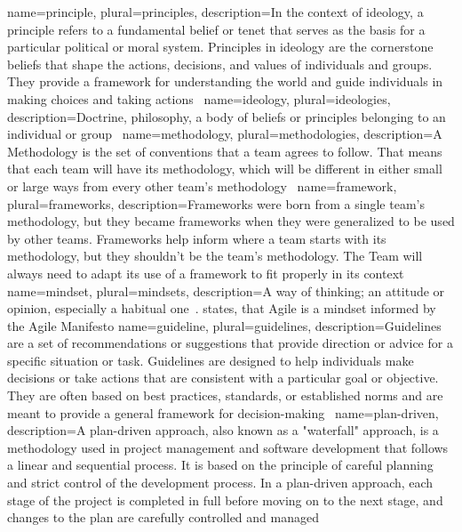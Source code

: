 {
    name={principle},
    plural={principles},
    description={In the context of ideology, a principle refers to a fundamental belief or tenet that serves as the basis for a particular political or moral system. Principles in ideology are the cornerstone beliefs that shape the actions, decisions, and values of individuals and groups. They provide a framework for understanding the world and guide individuals in making choices and taking actions~\cite{Cooper2018MVP}}
}
{
    name={ideology},
    plural={ideologies},
    description={Doctrine, philosophy, a body of beliefs or principles belonging to an individual or group~\cite{2018IvM}}
}
{
    name={methodology},
    plural={methodologies},
    description={A Methodology is the set of conventions that a team agrees to follow. That means that each team will have its methodology, which will be different in either small or large ways from every other team's methodology~\cite{2022WiA}}
}
{
    name={framework},
    plural={frameworks},
    description={Frameworks were born from a single team's methodology, but they became frameworks when they were generalized to be used by other teams. Frameworks help inform where a team starts with its methodology, but they shouldn't be the team's methodology. The Team will always need to adapt its use of a framework to fit properly in its context~\cite{2022WiA}}
}
{
    name={mindset},
    plural={mindsets},
    description={A way of thinking; an attitude or opinion, especially a habitual one~\cite{2018IvM}.  states, that Agile is a mindset informed by the Agile Manifesto}
}
{
    name={guideline},
    plural={guidelines},
    description={Guidelines are a set of recommendations or suggestions that provide direction or advice for a specific situation or task. Guidelines are designed to help individuals make decisions or take actions that are consistent with a particular goal or objective. They are often based on best practices, standards, or established norms and are meant to provide a general framework for decision-making~\cite{CambridgeDictionaryGE}}
}
{
    name={plan-driven},
    description={A plan-driven approach, also known as a "waterfall" approach, is a methodology used in project management and software development that follows a linear and sequential process. It is based on the principle of careful planning and strict control of the development process. In a plan-driven approach, each stage of the project is completed in full before moving on to the next stage, and changes to the plan are carefully controlled and managed~\cite{InnolutionPDP}}
}

